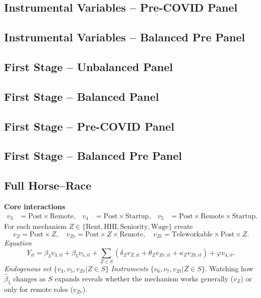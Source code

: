 \documentclass{article}
\newcommand{\cleanedresultsdir}{../results/cleaned}
\begin{document}
\subsection{Instrumental Variables -- Pre-COVID Panel}

\subsection{Instrumental Variables -- Balanced Pre Panel}


\subsection{First Stage -- Unbalanced Panel}


\subsection{First Stage -- Balanced Panel}


\subsection{First Stage -- Pre-COVID Panel}

\subsection{First Stage -- Balanced Pre Panel}


\clearpage
\subsection*{Full Horse–Race}
\textbf{Core interactions}
\[\begin{aligned}
 v_3 &= \text{Post}\!\times\!\text{Remote}, &
 v_4 &= \text{Post}\!\times\!\text{Startup}, &
 v_5 &= \text{Post}\!\times\!\text{Remote}\!\times\!\text{Startup}. 
\end{aligned}\]
For each mechanism $Z\in\{\text{Rent},\text{HHI},\text{Seniority},\text{Wage}\}$ create
\[v_Z = \text{Post}\!\times\! Z,\quad v_{Zr}=\text{Post}\!\times\! Z\!\times\!\text{Remote},\quad v_{Zt}=\text{Teleworkable}\!\times\!\text{Post}\!\times\! Z.\]
\emph{Equation}
\[Y_{it}=\beta_3 v_{3,it}+\beta_5 v_{5,it}+\sum_{Z\in S}(\delta_Z v_{Z,it}+\theta_Z v_{Zr,it}+\kappa_Z v_{Zt,it})+\varphi v_{4,it}.
\]
\emph{Endogenous set}\; $\{v_3,v_5,v_{Zr}|Z\in S\}$ \quad\emph{Instruments}\; $\{v_6,v_7,v_{Zt}|Z\in S\}$.
Watching how $\widehat\beta_5$ changes as $S$ expands reveals whether the mechanism works generally ($v_Z$) or only for remote roles ($v_{Zr}$).
\end{document}
